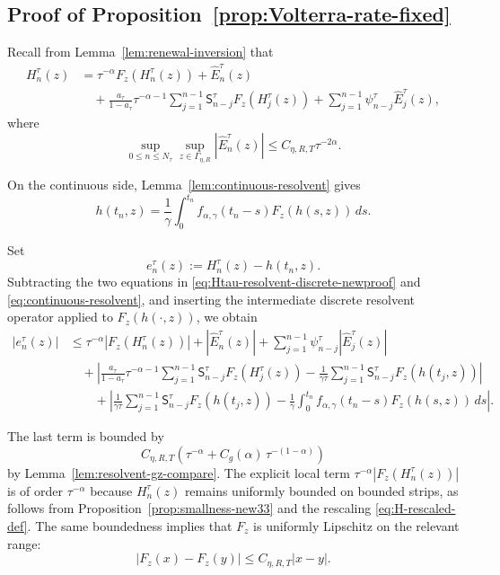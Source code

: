 \documentclass[letterpaper]{article}
\numberwithin{equation}{section}
\theoremstyle{definition}
\theoremstyle{remark}
\begin{document}

\subsection{Proof of Proposition~\ref{prop:Volterra-rate-fixed}}\label{app:proof-Volterra-rate-fixed}
Recall from Lemma~\ref{lem:renewal-inversion} that
\begin{equation}\label{eq:Htau-resolvent-discrete-newproof}
\begin{aligned}
  H_n^\tau(z)
  &=
  \tau^{-\alpha}F_z(H_n^\tau(z))
  +\widehat E_n^\tau(z)
\\
  &\quad
  +
  \frac{a_\tau}{1-a_\tau}\tau^{-\alpha-1}
  \sum_{j=1}^{n-1}\mathsf{S}_{n-j}^\tau F_z(H_j^\tau(z))
  +
  \sum_{j=1}^{n-1}\psi_{n-j}^\tau\widehat E_j^\tau(z),
\end{aligned}
\end{equation}
where
\[
  \sup_{0\le n\le N_\tau}\sup_{z\in\Gamma_{\eta,R}}
  |\widehat E_n^\tau(z)|
  \le C_{\eta,R,T}\tau^{-2\alpha}.
\]

On the continuous side, Lemma~\ref{lem:continuous-resolvent} gives
\[
  h(t_n,z)
  =
  \frac1\gamma\int_0^{t_n}
    f_{\alpha,\gamma}(t_n-s)F_z(h(s,z))\,ds.
\]

Set
\[
  e_n^\tau(z):=H_n^\tau(z)-h(t_n,z).
\]
Subtracting the two equations in \eqref{eq:Htau-resolvent-discrete-newproof} and \eqref{eq:continuous-resolvent}, and inserting the intermediate discrete resolvent
operator applied to $F_z(h(\cdot,z))$, we obtain
\begin{align*}
  |e_n^\tau(z)|
  &\le
  \tau^{-\alpha}|F_z(H_n^\tau(z))|
  +|\widehat E_n^\tau(z)|
  +\sum_{j=1}^{n-1}\psi_{n-j}^\tau |\widehat E_j^\tau(z)|
  \\
  &\quad
  +
  \left|
    \frac{a_\tau}{1-a_\tau}\tau^{-\alpha-1}
    \sum_{j=1}^{n-1}\mathsf{S}_{n-j}^\tau F_z(H_j^\tau(z))
    -
    \frac{1}{\gamma\tau}\sum_{j=1}^{n-1}\mathsf{S}_{n-j}^\tau F_z(h(t_j,z))
  \right|
  \\
  &\quad\quad
  +
  \left|
    \frac{1}{\gamma\tau}\sum_{j=1}^{n-1}\mathsf{S}_{n-j}^\tau F_z(h(t_j,z))
    -
    \frac1\gamma\int_0^{t_n}
      f_{\alpha,\gamma}(t_n-s)F_z(h(s,z))\,ds
  \right|.
\end{align*}

The last term is bounded by
\[
  C_{\eta,R,T}
  \left(\tau^{-\alpha}+{C_g(\alpha)}\,\tau^{-(1-\alpha)}\right)
\]
by Lemma~\ref{lem:resolvent-gz-compare}. The explicit local term
$\tau^{-\alpha}|F_z(H_n^\tau(z))|$ is of order $\tau^{-\alpha}$ because
$H_n^\tau(z)$ remains uniformly bounded on bounded strips, as follows from
Proposition~\ref{prop:smallness-new33} and the rescaling
\eqref{eq:H-rescaled-def}. The same boundedness implies that $F_z$ is
uniformly Lipschitz on the relevant range:
\[
  |F_z(x)-F_z(y)|\le C_{\eta,R,T}|x-y|.
\]
\end{document}
